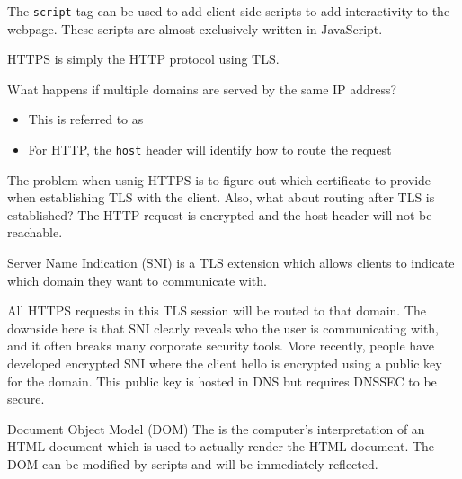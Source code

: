The \texttt{script} tag can be used to add client-side scripts to add interactivity to the webpage. These scripts are almost exclusively written in JavaScript.

\begin{dfnbox}{HTTPS}{}
     is simply the HTTP protocol using TLS.
\end{dfnbox}

What happens if multiple domains are served by the same IP address?
\begin{itemize}
    \item This is referred to as 
    \item For HTTP, the \texttt{host} header will identify how to route the request
\end{itemize}
The problem when usnig HTTPS is to figure out which certificate to provide when establishing TLS with the client. Also, what about routing after TLS is established? The HTTP request is encrypted and the host header will not be reachable.

\begin{dfnbox}{Server Name Indication (SNI)}{}
     is a TLS extension which allows clients to indicate which domain they want to communicate with.
\end{dfnbox}

All HTTPS requests in this TLS session will be routed to that domain. The downside here is that SNI clearly reveals who the user is communicating with, and it often breaks many corporate security tools. More recently, people have developed encrypted SNI where the client hello is encrypted using a public key for the domain. This public key is hosted in DNS but requires DNSSEC to be secure.

\begin{dfnbox}{Document Object Model (DOM)}{}
    The  is the computer's interpretation of an HTML document which is used to actually render the HTML document. The DOM can be modified by scripts and will be immediately reflected.
\end{dfnbox}

